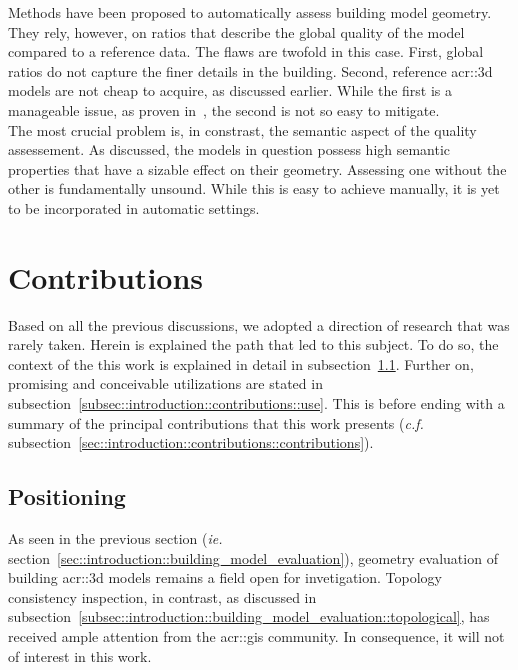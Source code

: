            Methods have been proposed to automatically assess building model geometry.
            They rely, however, on ratios that describe the global quality of the model compared to a reference data.
            The flaws are twofold in this case.
            First, global ratios do not capture the finer details in the building.
            Second, reference \gls{acr::3d} models are not cheap to acquire, as discussed earlier.
            While the first is a manageable issue, as proven in~\textcite{rottensteiner2012isprs}, the second is not so easy to mitigate.\\

            The most crucial problem is, in constrast, the semantic aspect of the quality assessement.
            As discussed, the models in question possess high semantic properties that have a sizable effect on their geometry.
            Assessing one without the other is fundamentally unsound.
            While this is easy to achieve manually, it is yet to be incorporated in automatic settings.
\section{Contributions}
    \label{sec::introduction::contributions}
    Based on all the previous discussions, we adopted a direction of research that was rarely taken.
    Herein is explained the path that led to this subject.
    To do so, the context of the this work is explained in detail in subsection~\ref{subsec::introduction::contributions::positioning}.
    Further on, promising and conceivable utilizations are stated in subsection~\ref{subsec::introduction::contributions::use}.
    This is before ending with a summary of the principal contributions that this work presents (\textit{c.f.} subsection~\ref{sec::introduction::contributions::contributions}).
    
    \subsection{Positioning}
        \label{subsec::introduction::contributions::positioning}
        As seen in the previous section (\textit{ie.} section~\ref{sec::introduction::building_model_evaluation}), geometry evaluation of building \gls{acr::3d} models remains a field open for invetigation.
        Topology consistency inspection, in contrast, as discussed in subsection~\ref{subsec::introduction::building_model_evaluation::topological}, has received ample attention from the \gls{acr::gis} community.
        In consequence, it will not of interest in this work.\\

